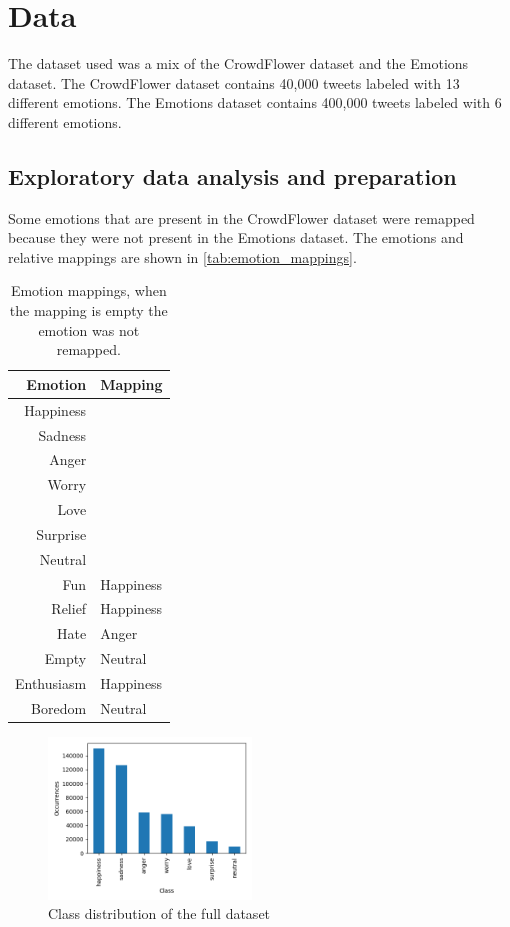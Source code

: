 \section{Data}
\label{sec:data}
The dataset used was a mix of the CrowdFlower 
dataset\cite{crowdflower_dataset} and the
Emotions dataset\cite{emotions_dataset}.
The CrowdFlower dataset contains 40,000 tweets
labeled with 13 different emotions. The Emotions 
dataset contains 400,000 tweets labeled with 6 
different emotions.

\subsection{Exploratory data analysis and preparation}
Some emotions that are present in the
CrowdFlower dataset were remapped because they
were not present in the Emotions dataset.
The emotions and relative mappings are shown
in \autoref{tab:emotion_mappings}.

\begin{table}[H]
    \centering
    \begin{tabular}{|r|l|}
        \hline
        \textbf{Emotion} & \textbf{Mapping} \\
        \hline
        Happiness & \\
        Sadness & \\
        Anger & \\
        Worry & \\
        Love & \\
        Surprise & \\
        Neutral & \\
        Fun  & Happiness \\
        Relief  & Happiness \\
        Hate  & Anger \\
        Empty  & Neutral \\
        Enthusiasm  & Happiness \\
        Boredom  & Neutral \\
        \hline
    \end{tabular}
    \caption{Emotion mappings, when the mapping is empty the emotion was not remapped.}
    \label{tab:emotion_mappings}
\end{table}

\begin{figure}[H]
    \centering
    \includegraphics[width=0.48\textwidth]{images/class_distribution.png}
    \caption{Class distribution of the full dataset}
    \label{fig:class_distribution}
\end{figure}

